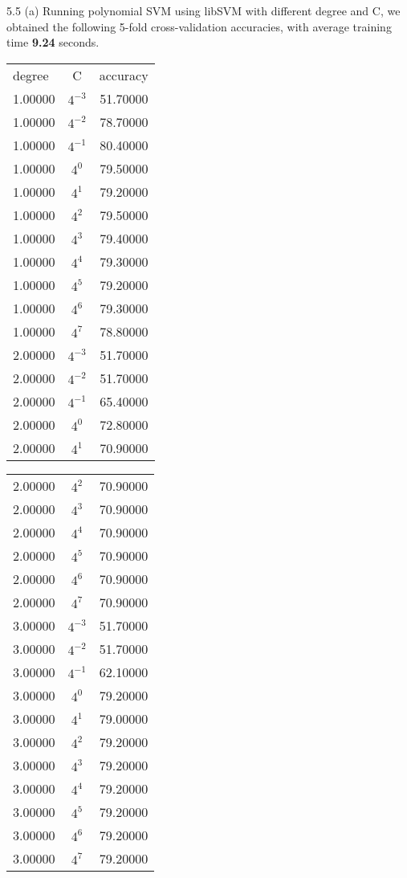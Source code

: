 \documentclass[12pt]{article}
\newenvironment{problem}[2][Problem]{\begin{trivlist}
\item[\hskip \labelsep {\bfseries #1}\hskip \labelsep {\bfseries #2}]}{\end{trivlist}}
\begin{document}
\begin{problem}{5. Programming}
\item{5.5 (a)}
Running polynomial SVM using libSVM with different degree and C, we obtained the following 5-fold cross-validation accuracies, with average training time \textbf{9.24} seconds.
\begin{center}
\begin{tabular}{ l | c | r }
    degree &   C  &  accuracy\\
    1.00000 &  $4^{-3}$  & 51.70000\\
    1.00000 &  $4^{-2}$  & 78.70000\\
    1.00000 &  $4^{-1}$  & 80.40000\\
    1.00000  &  $4^{0}$  & 79.50000\\
    1.00000  &  $4^{1}$ & 79.20000\\
    1.00000  &  $4^{2}$ & 79.50000\\
    1.00000  &  $4^{3}$ & 79.40000\\
    1.00000  &  $4^{4}$ & 79.30000\\
    1.00000  &  $4^{5}$ & 79.20000\\
    1.00000  &  $4^{6}$ &79.30000\\
    1.00000  &  $4^{7}$ & 78.80000\\
    2.00000  & $4^{-3}$ & 51.70000\\
    2.00000  & $4^{-2}$ & 51.70000\\
    2.00000  & $4^{-1}$ & 65.40000\\
    2.00000  &  $4^{0}$ & 72.80000\\
    2.00000  &  $4^{1}$ &70.90000\\
\end{tabular}
\begin{tabular}{ l | c | r }
    2.00000  &  $4^{2}$ & 70.90000\\
    2.00000  &  $4^{3}$ & 70.90000\\
    2.00000  &  $4^{4}$ & 70.90000\\
    2.00000  &  $4^{5}$ & 70.90000\\
    2.00000  &  $4^{6}$  &70.90000\\
    2.00000  &  $4^{7}$  &70.90000\\
    3.00000  & $4^{-3}$  &51.70000\\
    3.00000  & $4^{-2}$  &51.70000\\
    3.00000  & $4^{-1}$ & 62.10000\\
    3.00000  &  $4^{0}$  &79.20000\\
    3.00000  &  $4^{1}$ & 79.00000\\
    3.00000  &  $4^{2}$  &79.20000\\
    3.00000  &  $4^{3}$  &79.20000\\
    3.00000  &  $4^{4}$  &79.20000\\
    3.00000  &  $4^{5}$  &79.20000\\
    3.00000  &  $4^{6}$  &79.20000\\
    3.00000  &  $4^{7}$ & 79.20000\\
\end{tabular}
\end{center}
\end{problem}
 
\end{document}
